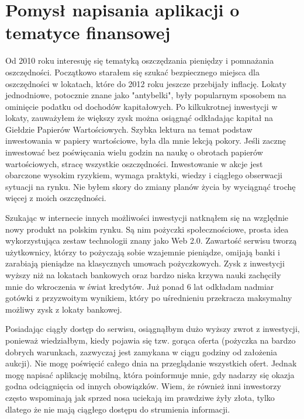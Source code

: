 \documentclass[a4paper,twoside,titlepage,openright]{book}
\begin{document}
\section*{Pomysł napisania aplikacji o tematyce finansowej}

Od 2010 roku interesuję się tematyką oszczędzania pieniędzy i pomnażania oszczędności. Początkowo starałem się szukać bezpiecznego miejsca dla oszczędności w lokatach, które do 2012 roku jeszcze przebijały inflację. Lokaty jednodniowe, potocznie znane jako "antybelki", były popularnym sposobem na ominięcie podatku od dochodów kapitałowych. Po kilkukrotnej inwestycji w lokaty, zauważyłem że większy zysk można osiągnąć odkładając kapitał na Giełdzie Papierów Wartościowych. Szybka lektura na temat podstaw inwestowania w papiery wartościowe, była dla mnie lekcją pokory. Jeśli zacznę inwestować bez poświęcania wielu godzin na naukę o obrotach papierów wartościowych, stracę wszystkie oszczędności. Inwestowanie w akcje jest obarczone wysokim ryzykiem, wymaga praktyki, wiedzy i ciągłego obserwacji sytuacji na rynku. Nie byłem skory do zmiany planów życia by wyciągnąć trochę więcej z moich oszczędności. 

Szukając w internecie innych możliwości inwestycji natknąłem się na względnie nowy produkt na polskim rynku. Są nim pożyczki społecznościowe, prosta idea wykorzystująca zestaw technologii znany jako Web 2.0. Zawartość serwisu tworzą użytkownicy, którzy to pożyczają sobie wzajemnie pieniądze, omijają banki i zarabiają pieniądze na klasycznych umowach pożyczkowych. Zysk z inwestycji wyższy niż na lokatach bankowych oraz bardzo niska krzywa nauki zachęciły mnie do wkroczenia w świat kredytów. Już ponad 6 lat odkładam nadmiar gotówki z przyzwoitym wynikiem, który po uśrednieniu przekracza maksymalny możliwy zysk z lokaty bankowej. 

Posiadając ciągły dostęp do serwisu, osiągnąłbym dużo wyższy zwrot z inwestycji, ponieważ wiedziałbym, kiedy pojawia się tzw. gorąca oferta (pożyczka na bardzo dobrych warunkach, zazwyczaj jest zamykana w ciągu godziny od założenia aukcji). Nie mogę poświęcić całego dnia na przeglądanie wszystkich ofert. Jednak mogę napisać aplikację mobilną, która poinformuje mnie, gdy nadarzy się okazja godna odciągnięcia od innych obowiązków. Wiem, że również inni inwestorzy często wspominają jak sprzed nosa uciekają im prawdziwe żyły złota, tylko dlatego że nie mają ciągłego dostępu do strumienia informacji.
\end{document}
